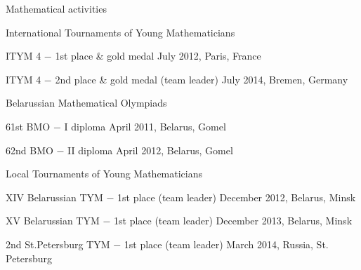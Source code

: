 \documentclass{resume} %
\begin{document}
\begin{rSection}{Mathematical activities}

\begin{rSubsection}{International Tournaments of Young Mathematicians}{}{}

\item ITYM 4 $-$ 1st place \& gold medal \hfill July 2012, Paris, France
\item ITYM 4 $-$ 2nd place \& gold medal (team leader) \hfill July 2014, Bremen, Germany

\end{rSubsection}

\begin{rSubsection}{Belarussian Mathematical Olympiads}{}{}

\item 61st BMO $-$ I diploma \hfill  April 2011, Belarus, Gomel
\item 62nd BMO $-$ II diploma \hfill April 2012, Belarus, Gomel
\end{rSubsection}


\begin{rSubsection}{Local Tournaments of Young Mathematicians}{}{}

\item XIV Belarussian TYM $-$ 1st place (team leader) \hfill December 2012, Belarus, Minsk
\item XV Belarussian TYM $-$ 1st place (team leader) \hfill December 2013, Belarus, Minsk
\item 2nd St.Petersburg TYM $-$ 1st place (team leader) \hfill March 2014, Russia, St. Petersburg
\end{rSubsection}



\end{rSection}





\end{document}
